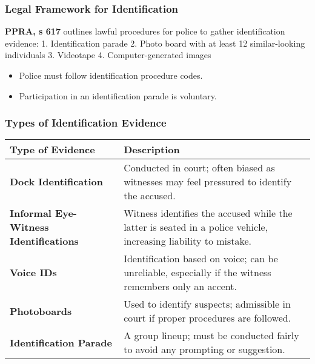 \subsubsection{Legal Framework for
Identification}\label{legal-framework-for-identification}

\textbf{PPRA, s 617} outlines lawful procedures for police to gather
identification evidence: 1. Identification parade 2. Photo board with at
least 12 similar-looking individuals 3. Videotape 4. Computer-generated
images

\begin{itemize}
\tightlist
\item
  Police must follow identification procedure codes.
\item
  Participation in an identification parade is voluntary.
\end{itemize}

\subsubsection{Types of Identification
Evidence}\label{types-of-identification-evidence}

\begin{longtable}[]{@{}
  >{\raggedright\arraybackslash}p{}
  >{\raggedright\arraybackslash}p{}@{}}
\toprule\noalign{}
\begin{minipage}[b]{\linewidth}\raggedright
Type of Evidence
\end{minipage} & \begin{minipage}[b]{\linewidth}\raggedright
Description
\end{minipage} \\
\midrule\noalign{}
\endhead
\bottomrule\noalign{}
\endlastfoot
\textbf{Dock Identification} & Conducted in court; often biased as
witnesses may feel pressured to identify the accused. \\
\textbf{Informal Eye-Witness Identifications} & Witness identifies the
accused while the latter is seated in a police vehicle, increasing
liability to mistake. \\
\textbf{Voice IDs} & Identification based on voice; can be unreliable,
especially if the witness remembers only an accent. \\
\textbf{Photoboards} & Used to identify suspects; admissible in court if
proper procedures are followed. \\
\textbf{Identification Parade} & A group lineup; must be conducted
fairly to avoid any prompting or suggestion. \\
\end{longtable}

